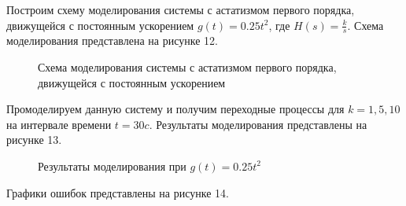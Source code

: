 \documentclass[a4paper, 11pt]{article}
\begin{document}
\par 
Построим схему моделирования системы с астатизмом первого порядка, движущейся с постоянным ускорением $g(t)=0.25t^2$, где $H(s)=\frac{k}{s}$. Схема моделирования представлена на рисунке 12. 

\begin{figure}[h!]
\caption{Схема моделирования системы с астатизмом первого порядка, движущейся с постоянным ускорением}
\label{ris:image}
\end{figure}

\par 
Промоделируем данную систему и получим переходные процессы для $k = 1, 5, 10$ на интервале времени $t = 30c$. Результаты моделирования представлены на рисунке 13. 

\newpage
\begin{figure}[h!]
\centering
{}
\caption{Результаты моделирования при $g(t)=0.25t^2$}
\end{figure}

\par 
Графики ошибок представлены на рисунке 14.
\end{document}
